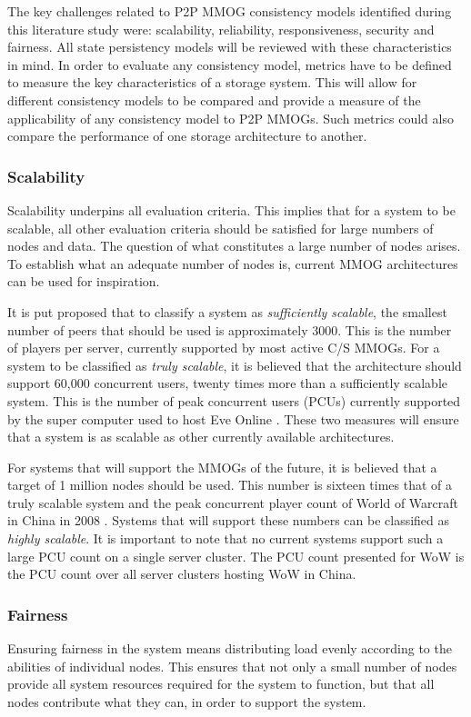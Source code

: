 \documentclass[10pt,a4paper,journal,cspaper,compsoc]{IEEEtran}
\begin{document}
The key challenges related to P2P MMOG consistency models identified during this literature study were: scalability, reliability, responsiveness,
security and fairness. All state persistency models will be reviewed with these characteristics in mind. In order to evaluate any consistency model,
metrics have to be defined to measure the key characteristics of a storage system. This will allow for different consistency models to be compared
and provide a measure of the applicability of any consistency model to P2P MMOGs. Such metrics could also compare the performance of one storage
architecture to another.

\subsubsection{Scalability}
Scalability underpins all evaluation criteria. This implies that for a system to be scalable, all other evaluation criteria should be satisfied for
large numbers of nodes and data. The question of what constitutes a large number of nodes arises. To establish what an adequate number of nodes is,
current MMOG architectures can be used for inspiration.

It is put proposed that to classify a system as \emph{sufficiently scalable}, the smallest number of peers that should be used is approximately 3000.
This is the number of players per server, currently supported by most active C/S MMOGs. For a system to be classified as \emph{truly scalable}, it is
believed that the architecture should support 60,000 concurrent users, twenty times more than a sufficiently scalable system. This is the number of
peak concurrent users (PCUs) currently supported by the super computer used to host Eve Online \cite{eve_pcu}. These two measures will ensure that a
system is as scalable as other currently available architectures.

For systems that will support the MMOGs of the future, it is believed that a target of 1 million nodes should be used. This number is sixteen times
that of a truly scalable system and the peak concurrent player count of World of Warcraft in China in 2008 \cite{WoW_china_pcu}. Systems that will
support these numbers can be classified as \emph{highly scalable}. It is important to note that no current systems support such a large PCU count on
a single server cluster. The PCU count presented for WoW is the PCU count over all server clusters hosting WoW in China.

\subsubsection{Fairness}
Ensuring fairness in the system means distributing load evenly according to the abilities of individual nodes. This ensures that not only a small
number of nodes provide all system resources required for the system to function, but that all nodes contribute what they can, in order to support
the system.
\end{document}
